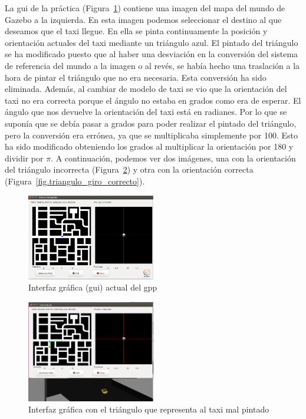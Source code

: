 La \acrshort{gui} de la práctica (Figura~\ref{fig.gui_correcta}) contiene una imagen del mapa del mundo de Gazebo a la izquierda. En esta imagen podemos seleccionar el destino al que deseamos que el taxi llegue. En ella se pinta continuamente la posición y orientación actuales del taxi mediante un triángulo azul. El pintado del triángulo se ha modificado puesto que al haber una desviación en la conversión del sistema de referencia del mundo a la imagen o al revés, se había hecho una traslación a la hora de pintar el triángulo que no era necesaria. Esta conversión ha sido eliminada. Además, al cambiar de modelo de taxi se vio que la orientación del taxi no era correcta porque el ángulo no estaba en grados como era de esperar. El ángulo que nos devuelve la orientación del taxi está en radianes. Por lo que se suponía que se debía pasar a grados para poder realizar el pintado del triángulo, pero la conversión era errónea, ya que se multiplicaba simplemente por 100. Esto ha sido modificado obteniendo los grados al multiplicar la orientación por 180 y dividir por \(\pi\). A continuación, podemos ver dos imágenes, una con la orientación del triángulo incorrecta (Figura~\ref{fig.triangulo_girado_mal}) y otra con la orientación correcta (Figura~\ref{fig.triangulo_giro_correcto}).\\

\begin{figure}[H]
  \begin{center}
    \includegraphics[width=0.5\textwidth]{figures/GPP/GUI_correcta.png}
		\caption{Interfaz gráfica (\acrshort{gui}) actual del \acrshort{gpp}}
		\label{fig.gui_correcta}
		\end{center}
\end{figure}

\begin{figure}[H]
  \begin{center}
    \includegraphics[width=0.5\textwidth]{figures/GPP/triangulo_girado_mal.png}
		\caption{Interfaz gráfica con el triángulo que representa al taxi mal pintado}
		\label{fig.triangulo_girado_mal}
		\end{center}
\end{figure}

